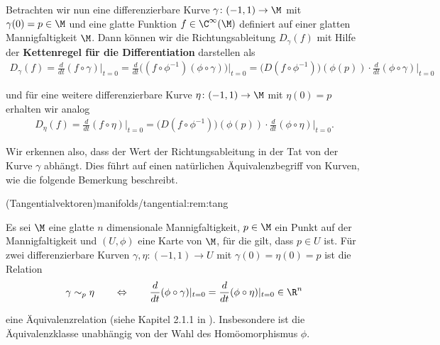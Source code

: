 \documentclass[letterpaper,10pt,german]{jupyterBook}
\begin{document}
\par
Betrachten wir nun eine differenzierbare Kurve \(\gamma \colon (-1, 1) \rightarrow \M\) mit \(\gamma(0)=p \in \M\) und eine glatte Funktion \(f \in \C^\infty(\M)\) definiert auf einer glatten Mannigfaltigkeit \(\M\).
Dann können wir die Richtungsableitung \(D_\gamma(f)\) mit Hilfe der \textbf{Kettenregel für die Differentiation} darstellen als
\begin{align*}
D_\gamma(f) = \frac{d}{dt}(f\circ \gamma)\big\rvert_{t=0} = \frac{d}{dt}\big( (f\circ \phi^{-1}) (\phi \circ \gamma) \big)\rvert_{t=0} = 
\big(D(f\circ \phi^{-1})\big)(\phi(p))\cdot \frac{d}{dt}(\phi \circ \gamma)\rvert_{t=0}
\end{align*}
\par
und für eine weitere differenzierbare Kurve \(\eta \colon (-1, 1) \rightarrow \M\) mit \(\eta(0)=p\) erhalten wir analog
\begin{align*}
D_\eta(f) = \frac{d}{dt}(f\circ \eta)\big\rvert_{t=0} = 
\big(D(f\circ \phi^{-1})\big)(\phi(p))\cdot \frac{d}{dt}(\phi \circ \eta)\rvert_{t=0}.
\end{align*}
\par
Wir erkennen also, dass der Wert der Richtungsableitung in der Tat von der Kurve \(\gamma\) abhängt.
Dies führt auf einen natürlichen Äquivalenzbegriff von Kurven, wie die folgende Bemerkung beschreibt.
\begin{remark}{(Tangentialvektoren)}{manifolds/tangential:rem:tang}



\par
Es sei \(\M\) eine glatte \(n\) dimensionale Mannigfaltigkeit, \(p\in\M\) ein Punkt auf der Mannigfaltigkeit und \((U,\phi)\) eine Karte von \(\M\), für die gilt, dass \(p\in U\) ist.
Für zwei differenzierbare Kurven \(\gamma, \eta:(-1,1) \to U\) mit \(\gamma(0) = \eta(0) = p\) ist die Relation
\begin{align*}
\gamma \sim_p \eta
\qquad \Leftrightarrow \qquad
\frac{d}{dt}(\phi \circ \gamma)\rvert_{t=0} = \frac{d}{dt}(\phi \circ \eta)\rvert_{t=0}\in \R^n
\end{align*}
\par
eine Äquivalenzrelation (siehe Kapitel 2.1.1 in \cite{Bur20}).
Insbesondere ist die Äquivalenzklasse unabhängig von der Wahl des Homöomorphismus \(\phi\).
\end{remark}
\end{document}
